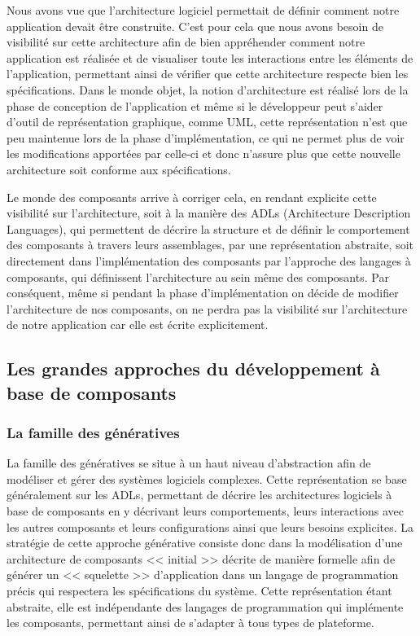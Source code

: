   Nous avons vue que l'architecture logiciel permettait de définir comment notre application devait être construite. C'est pour cela que nous avons besoin de visibilité sur cette architecture afin de bien appréhender comment notre application est réalisée et de visualiser toute les interactions entre les éléments de l'application, permettant ainsi de vérifier que cette architecture respecte bien les spécifications. Dans le monde objet, la notion d'architecture est réalisé lors de la phase de conception de l'application et même si le développeur peut s'aider d'outil de représentation graphique, comme UML, cette représentation n'est que peu maintenue lors de la phase d'implémentation, ce qui ne permet plus de voir les modifications apportées par celle-ci et donc n'assure plus que cette nouvelle architecture soit conforme aux spécifications. \\\par
  
  Le monde des composants arrive à corriger cela, en rendant explicite cette visibilité sur l'architecture, soit à la manière des ADLs (Architecture Description Languages), qui permettent de décrire la structure et de définir le comportement des composants à travers leurs assemblages, par une représentation abstraite, soit directement dans l'implémentation des composants par l'approche des langages à composants, qui définissent l'architecture au sein même des composants. Par conséquent, même si pendant la phase d'implémentation on décide de modifier l'architecture de nos composants, on ne perdra pas la visibilité sur l'architecture de notre application car elle est écrite explicitement. \\\par
  
\subsection{Les grandes approches du développement à base de composants}
      
      \subsubsection{La famille des génératives}
      
      La famille des génératives se situe à un haut niveau d'abstraction afin de modéliser et gérer des systèmes logiciels complexes. Cette représentation se base généralement sur les ADLs, permettant de décrire les architectures logiciels à base de composants en y décrivant leurs comportements, leurs interactions avec les autres composants et leurs configurations ainsi que leurs besoins explicites. La stratégie de cette approche générative consiste donc dans la modélisation d'une architecture de composants << initial >> décrite de manière formelle afin de générer un << squelette >> d'application dans un langage de programmation précis qui respectera les spécifications du système. Cette représentation étant abstraite, elle est indépendante des langages de programmation qui implémente les composants, permettant ainsi de s'adapter à tous types de plateforme. \\\par
      
